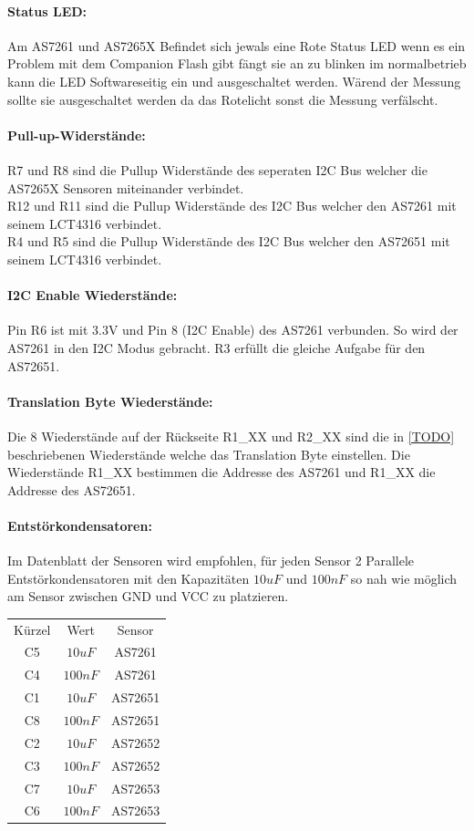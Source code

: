 \paragraph{Status LED:} Am AS7261 und AS7265X Befindet sich jewals eine Rote Status LED wenn es ein Problem mit dem Companion Flash gibt fängt sie an zu blinken im normalbetrieb kann die LED Softwareseitig ein und ausgeschaltet werden.
	Wärend der Messung sollte sie ausgeschaltet werden da das Rotelicht sonst die Messung verfälscht.

\paragraph{Pull-up-Widerstände:}
R7 und R8 sind die Pullup Widerstände des seperaten I2C Bus welcher die AS7265X Sensoren miteinander verbindet.\\
R12 und R11 sind die Pullup Widerstände des I2C Bus welcher den AS7261 mit seinem LCT4316 verbindet.\\
R4 und R5 sind die Pullup Widerstände des I2C Bus welcher den AS72651 mit seinem LCT4316 verbindet.

\paragraph{I2C Enable Wiederstände:} Pin R6 ist mit 3.3V und Pin 8 (I2C Enable) des AS7261 verbunden. So wird der AS7261 in den I2C Modus gebracht.
	R3 erfüllt die gleiche Aufgabe für den AS72651.
	
\paragraph{Translation Byte Wiederstände:}
Die 8 Wiederstände auf der Rückseite R1\_XX und R2\_XX sind die in \ref{TODO} beschriebenen Wiederstände welche das Translation Byte einstellen. Die Wiederstände R1\_XX bestimmen die Addresse des AS7261 und R1\_XX die Addresse des AS72651.

\paragraph{Entstörkondensatoren:} Im Datenblatt der Sensoren wird empfohlen, für jeden Sensor 2 Parallele Entstörkondensatoren mit den Kapazitäten $10uF$ und $100nF$ so nah wie möglich am Sensor zwischen GND und VCC zu platzieren.


\begin{center}
\begin{tabular}{ c c c }
 Kürzel & Wert & Sensor \\ 
 C5 & $10uF$ & AS7261 \\  
 C4 & $100nF$ & AS7261 \\
 C1 & $10uF$ & AS72651 \\  
 C8 & $100nF$ & AS72651 \\
 C2 & $10uF$ & AS72652 \\  
 C3 & $100nF$ & AS72652 \\
 C7 & $10uF$ & AS72653 \\  
 C6 & $100nF$ & AS72653 \\
\end{tabular}
\end{center}


